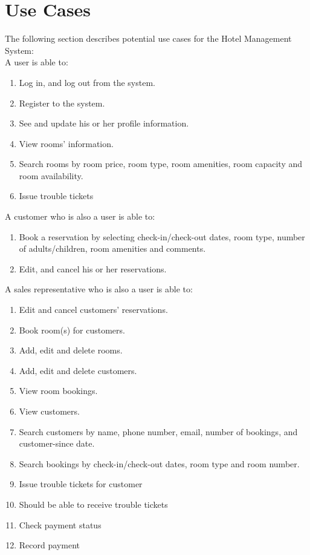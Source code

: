 \section{Use Cases}
The following section describes potential use cases for the Hotel Management System:\\

\setlength{\parskip}{10pt plus 1pt minus 1pt}
A user is able to:
\begin{enumerate}
	\item Log in, and log out from the system.
	\item Register to the system.
	\item See and update his or her profile information.
	\item View rooms' information.
	\item Search rooms by room price, room type, room amenities, room capacity and room availability.
	\item Issue trouble tickets
\end{enumerate}


A customer who is also a user is able to:
\begin{enumerate}
	\item Book a reservation by selecting check-in/check-out dates, room type, number of adults/children, room amenities and comments.
	\item Edit, and cancel his or her reservations.
\end{enumerate}


A sales representative who is also a user is able to:
\begin{enumerate}
	\item Edit and cancel customers' reservations.
		\label{editCustomers}
	\item Book room(s) for customers.
		\label{bookRooms}
	\item Add, edit and delete rooms.
		\label{manageRooms}
	\item Add, edit and delete customers.
		\label{manageCustomers}
	\item View room bookings.
		\label{viewRooms}
	\item View customers.
		\label{viewCustomers}
	\item Search customers by name, phone number, email, number of bookings, and customer-since date.
		\label{searchCustomers}
	\item Search bookings by check-in/check-out dates, room type and room number.
		\label{searchRooms}
	\item Issue trouble tickets for customer
		\label{issueTickets}
	\item Should be able to receive trouble tickets
		\label{receiveTickets}
	\item Check payment status
		\label{paymentStatus}
	\item Record payment
		\label{recordPayment}
\end{enumerate}

